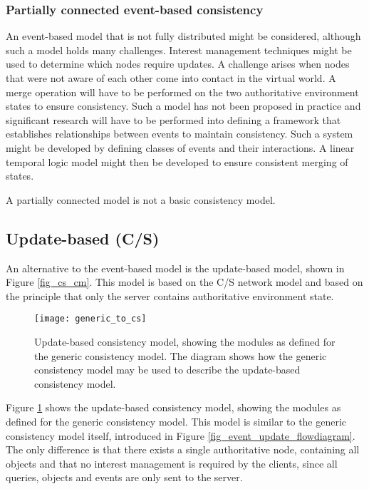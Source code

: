\subsubsection{Partially connected event-based consistency}
An event-based model that is not fully distributed might be considered, although such a model holds many challenges. Interest management techniques might be used to determine which nodes require updates. A challenge arises when nodes that were not aware of each other come into contact in the virtual world. A merge operation will have to be performed on the two authoritative environment states to ensure consistency. Such a model has not been proposed in practice and significant research will have to be performed into defining a framework that establishes relationships between events to maintain consistency. Such a system might be developed by defining classes of events and their interactions. A linear temporal logic model might then be developed to ensure consistent merging of states.

A partially connected model is not a basic consistency model.

\subsection{Update-based (C/S)}
\label{classic_update_based}

An alternative to the event-based model is the update-based model, shown in Figure \ref{fig_cs_cm}. This model is based on the C/S network model and based on the principle that only the server contains authoritative environment state.

\begin{figure}[htbp]
 \centering
 \texttt{[image: generic\_to\_cs]}
 \caption{Update-based consistency model, showing the modules as defined for the generic consistency model. The diagram shows how the generic consistency model may be used to describe the update-based consistency model.}
 \label{fig_generic_to_cs}
\end{figure}
%
Figure \ref{fig_generic_to_cs} shows the update-based consistency model, showing the modules as defined for the generic consistency model. This model is similar to the generic consistency model itself, introduced in Figure \ref{fig_event_update_flowdiagram}. The only difference is that there exists a single authoritative node, containing all objects and that no interest management is required by the clients, since all queries, objects and events are only sent to the server.

